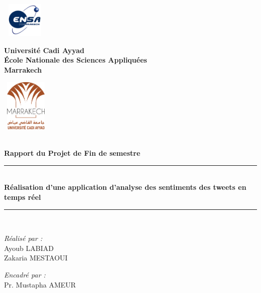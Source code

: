\begin{center}
  \begin{minipage}{2.5cm}
    \begin{center}
      \includegraphics[width=2.2cm,height=1.7cm]{cover/assets/ensa-marrakech-logo.png}
    \end{center}
  \end{minipage}\hfill
  \begin{minipage}{10cm}
    \begin{center}
      \textbf{ Université Cadi Ayyad}\\[0.1cm]
      \textbf{\uppercase{é}cole Nationale des Sciences Appliquées}\\[0.1cm]
      \textbf{Marrakech}
    \end{center}
  \end{minipage}\hfill
  \begin{minipage}{2.5cm}
    \begin{center}
      \includegraphics[width=2.3cm,height=2.5cm]{cover/assets/uca-logo.png}
    \end{center}

  \end{minipage}
  \textsc{\Large }\\[4.2cm]
  {\large \bfseries Rapport du Projet de Fin de semestre}\\[1.5cm]


  \rule{\linewidth}{0.3mm} \\[0.2cm]
  { \huge \bfseries Réalisation d'une application d'analyse des sentiments des tweets en temps réel \\[0.2cm] }
  \rule{\linewidth}{0.3mm} \\[3cm]

  \noindent
  \begin{minipage}{0.48\textwidth}
    \begin{flushleft} \large
      \textit{Réalisé par :}\\
      Ayoub LABIAD \\
      Zakaria MESTAOUI \\[2cm]
    \end{flushleft}
  \end{minipage}%
  \begin{minipage}{0.48\textwidth}
    \begin{flushright} \large
      \textit{Encadré par :} \\
      Pr. Mustapha AMEUR\\
    \end{flushright}
  \end{minipage}\\[2cm]



\end{center}
